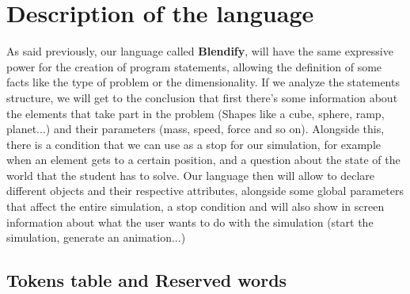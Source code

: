\documentclass[12pt]{article}
\begin{document}
\section{Description of the language}

As said previously, our language called \textbf{Blendify}, will have the same expressive power for the creation of program statements, allowing the definition of some facts like the type of problem or the dimensionality. If we analyze the statements structure, we will get to the conclusion that first there's some information about the elements that take part in the problem (Shapes like a cube, sphere, ramp, planet...) and their parameters (mass, speed, force and so on). Alongside this, there is a condition that we can use as a stop for our simulation, for example when an element gets to a certain position, and a question about the state of the world that the student has to solve. Our language then will allow to declare different objects and their respective attributes, alongside some global parameters that affect the entire simulation, a stop condition and will also show in screen information about what the user wants to do with the simulation (start the simulation, generate an animation...)
\subsection{Tokens table and Reserved words}
\end{document}
